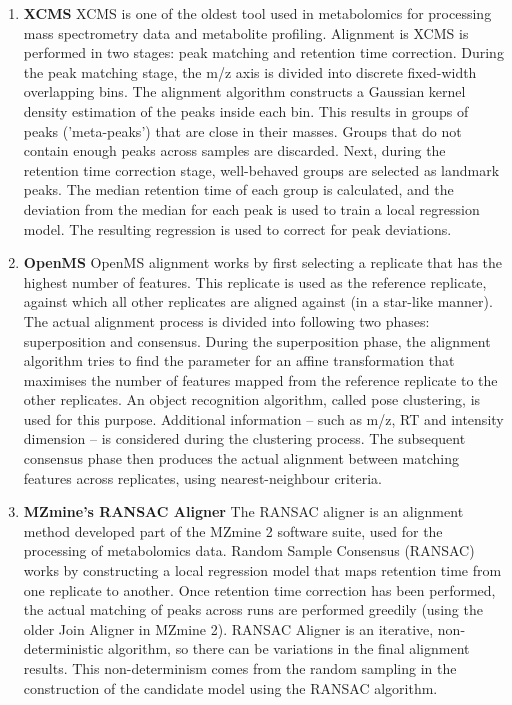 \begin{enumerate}
\item \textbf{XCMS} \cite{Smith2006} XCMS is one of the oldest tool used in metabolomics for processing mass spectrometry data and metabolite profiling. Alignment is XCMS is performed in two stages: peak matching and retention time correction. During the peak matching stage, the m/z axis is divided into discrete fixed-width overlapping bins. The alignment algorithm constructs a Gaussian kernel density estimation of the peaks inside each bin. This results in groups of peaks ('meta-peaks') that are close in their masses. Groups that do not contain enough peaks across samples are discarded. Next, during the retention time correction stage, well-behaved groups are selected as landmark peaks. The median retention time of each group is calculated, and the deviation from the median for each peak is used to train a local regression model. The resulting regression is used to correct for peak deviations.
\item \textbf{OpenMS} \cite{Lange2007} OpenMS alignment works by first selecting a replicate that has the highest number of features. This replicate is used as the reference replicate, against which all other replicates are aligned against (in a star-like manner). The actual alignment process is divided into following two phases: superposition and consensus. During the superposition phase, the alignment algorithm tries to find the parameter for an affine transformation that maximises the number of features mapped from the reference replicate to the other replicates. An object recognition algorithm, called pose clustering, is used for this purpose. Additional information -- such as m/z, RT and intensity dimension -- is considered during the clustering process. The subsequent consensus phase then produces the actual alignment between matching features across replicates, using nearest-neighbour criteria. %
\item \textbf{MZmine's RANSAC Aligner} \cite{Pluskal2010} The RANSAC aligner is an alignment method developed part of the MZmine 2 software suite, used for the processing of metabolomics data. Random Sample Consensus (RANSAC) works by constructing a local regression model that maps retention time from one replicate to another. Once retention time correction has been performed, the actual matching of peaks across runs are performed greedily (using the older Join Aligner in MZmine 2). RANSAC Aligner is an iterative, non-deterministic algorithm, so there can be variations in the final alignment results. This non-determinism comes from the random sampling in the construction of the candidate model using the RANSAC algorithm\cite{Fischler1981}. 
\end{enumerate}

